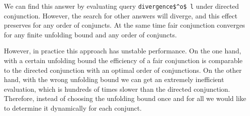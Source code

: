 We can find this answer by evaluating query \lstinline{divergence$^o$ l} under directed conjunction. However, the search for other answers will diverge, and this effect preserves
for any order of conjuncts. At the same time fair conjunction converges for any finite unfolding bound and any order of conjuncts.

However, in practice this approach has unstable performance. On the one hand, with a certain unfolding bound the efficiency of a fair conjunction is comparable to the directed conjunction
with an optimal order of conjunctions. On the other hand, with the wrong unfolding bound we can get an extremely inefficient evaluation, which is hundreds of times slower than the directed
conjunction. Therefore, instead of choosing the unfolding bound once and for all we would like to determine it dynamically for each conjunct.


